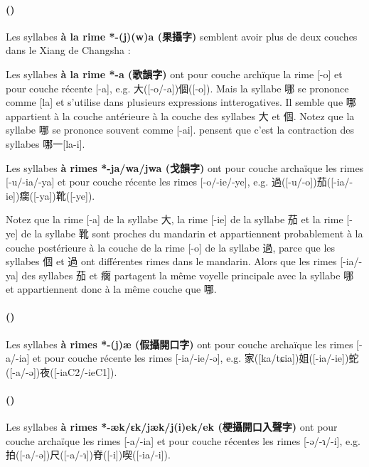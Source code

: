 \documentclass{scrbook}
\newcounter{c}[subsubsection]
\newcommand{\stpc}[1]{\stepcounter{#1}}
\newcommand{\termyyx}[1]{\textbf{#1}}
\begin{document}
\begin{sloppypar}
\stpc{c}\paragraph{()}
Les syllabes \termyyx{à la rime *-(j)(w)a (果攝字)} semblent avoir plus de deux couches dans le Xiang de Changsha : 

Les syllabes \termyyx{à la rime *-a (歌韻字)} ont pour couche archïque la rime [-o] et pour couche récente [-a], e.g. 大([-o/-a])個([-o]). Mais la syllabe 哪 se prononce comme [la] et s'utilise dans plusieurs expressions intterogatives. Il semble que 哪 appartient à la couche antérieure à la couche des syllabes 大 et 個. Notez que la syllabe 哪 se prononce souvent comme [-ai]. \textcite[20]{Bao1998Changsha} pensent que c'est la contraction des syllabes 哪一[la-i]. %

Les syllabes \termyyx{à rimes *-ja/wa/jwa (戈韻字)} ont pour couche archaïque les rimes [-u/-ia/-ya] et pour couche récente les rimes [-o/-ie/-ye], e.g. 過([-u/-o])茄([-ia/-ie])瘸([-ya])靴([-ye]). %

Notez que la rime [-a] de la syllabe 大, la rime [-ie] de la syllabe 茄 et la rime [-ye] de la syllabe 靴 sont proches du mandarin et appartiennent probablement à la couche postérieure à la couche de la rime [-o] de la syllabe 過, parce que les syllabes 個 et 過 ont différentes rimes dans le mandarin. Alors que les rimes [-ia/-ya] des syllabes 茄 et 瘸 partagent la même voyelle principale avec la syllabe 哪 et appartiennent donc à la même couche que 哪.

\stpc{c}\paragraph{()}
Les syllabes \termyyx{à rimes *-(j)æ (假攝開口字)} ont pour couche archaïque les rimes [-a/-ia] et pour couche récente les rimes [-ia/-ie/-ə], e.g. 家([ka/tɕia])姐([-ia/-ie])蛇([-a/-ə])夜([-iaC2/-ieC1]).

\stpc{c}\paragraph{()}
Les syllabes \termyyx{à rimes *-æk/ɛk/jæk/j(i)ek/ek (梗攝開口入聲字)} ont pour couche archaïque les rimes [-a/-ia] et pour couche récentes les rimes [-ə/-ɿ/-i], e.g. 拍([-a/-ə])尺([-a/-ɿ])脊([-i])喫([-ia/-i]). 


\end{sloppypar}
\end{document}
